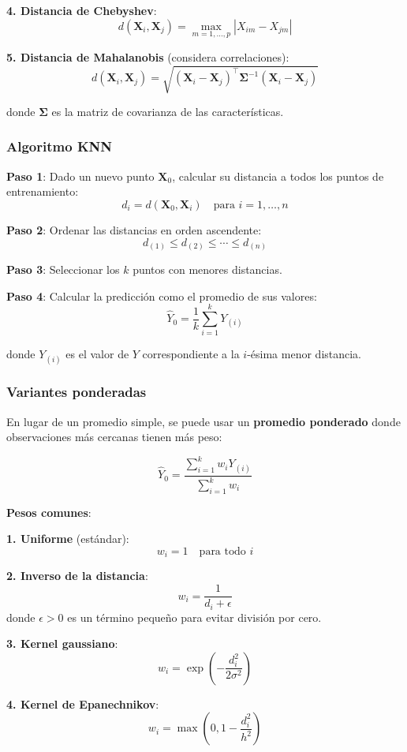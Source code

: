 \documentclass[
  doc,
  floatsintext,
  longtable,
  a4paper,
  nolmodern,
  notxfonts,
  notimes,
  12pt,
  colorlinks=true,linkcolor=blue,citecolor=blue,urlcolor=blue]{apa7}
\begin{document}
\textbf{4. Distancia de Chebyshev}: \[
d(\mathbf{X}_i, \mathbf{X}_j) = \max_{m=1,\ldots,p} |X_{im} - X_{jm}|
\]

\textbf{5. Distancia de Mahalanobis} (considera correlaciones): \[
d(\mathbf{X}_i, \mathbf{X}_j) = \sqrt{(\mathbf{X}_i - \mathbf{X}_j)^\top \mathbf{\Sigma}^{-1} (\mathbf{X}_i - \mathbf{X}_j)}
\]

donde \(\mathbf{\Sigma}\) es la matriz de covarianza de las
características.

\subsubsection{Algoritmo KNN}\label{algoritmo-knn}

\textbf{Paso 1}: Dado un nuevo punto \(\mathbf{X}_0\), calcular su
distancia a todos los puntos de entrenamiento: \[
d_i = d(\mathbf{X}_0, \mathbf{X}_i) \quad \text{para } i = 1, \ldots, n
\]

\textbf{Paso 2}: Ordenar las distancias en orden ascendente: \[
d_{(1)} \leq d_{(2)} \leq \cdots \leq d_{(n)}
\]

\textbf{Paso 3}: Seleccionar los \(k\) puntos con menores distancias.

\textbf{Paso 4}: Calcular la predicción como el promedio de sus valores:
\[
\hat{Y}_0 = \frac{1}{k} \sum_{i=1}^{k} Y_{(i)}
\]

donde \(Y_{(i)}\) es el valor de \(Y\) correspondiente a la \(i\)-ésima
menor distancia.

\subsubsection{Variantes ponderadas}\label{variantes-ponderadas}

En lugar de un promedio simple, se puede usar un \textbf{promedio
ponderado} donde observaciones más cercanas tienen más peso:

\[
\hat{Y}_0 = \frac{\sum_{i=1}^{k} w_i Y_{(i)}}{\sum_{i=1}^{k} w_i}
\]

\textbf{Pesos comunes}:

\textbf{1. Uniforme} (estándar): \[
w_i = 1 \quad \text{para todo } i
\]

\textbf{2. Inverso de la distancia}: \[
w_i = \frac{1}{d_i + \epsilon}
\] donde \(\epsilon > 0\) es un término pequeño para evitar división por
cero.

\textbf{3. Kernel gaussiano}: \[
w_i = \exp\left(-\frac{d_i^2}{2\sigma^2}\right)
\]

\textbf{4. Kernel de Epanechnikov}: \[
w_i = \max\left(0, 1 - \frac{d_i^2}{h^2}\right)
\]
\end{document}
